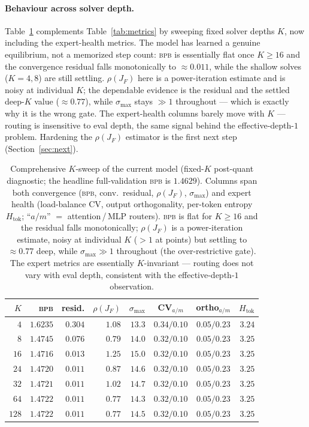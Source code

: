 \documentclass[11pt]{article}
\newcommand{\rhoF}{\rho(J_F)}
\newcommand{\bpb}{\textsc{bpb}}
\begin{document}
\paragraph{Behaviour across solver depth.} Table~\ref{tab:ksweep} complements
Table~\ref{tab:metrics} by sweeping fixed solver depths $K$, now including the
expert-health metrics. The model has learned a
genuine equilibrium, not a memorized step count: \bpb{} is essentially flat once
$K\ge 16$ and the convergence residual falls monotonically to $\approx\!0.011$, while
the shallow solves ($K{=}4,8$) are still settling. $\rhoF$ here is a power-iteration
estimate and is noisy at individual $K$; the dependable evidence is the residual and
the settled deep-$K$ value ($\approx\!0.77$), while $\sigma_{\max}$ stays $\gg 1$
throughout --- which is exactly why it is the wrong gate. The expert-health columns
barely move with $K$ --- routing is insensitive to eval depth, the same signal behind
the effective-depth-$1$ problem. Hardening the $\rhoF$ estimator is the first next
step (Section~\ref{sec:next}).

\begin{table}[H]
\centering
\footnotesize
\setlength{\tabcolsep}{4.5pt}
\renewcommand{\arraystretch}{1.2}
\begin{tabular}{@{}r r r r r c c r@{}}
\toprule
$K$ & \bpb{} & resid. & $\rhoF$ & $\sigma_{\max}$ & CV$_{a/m}$ & ortho$_{a/m}$ & $H_{\text{tok}}$ \\
\midrule
$4$   & $1.6235$ & $0.304$ & $1.08$ & $13.3$ & $0.34/0.10$ & $0.05/0.23$ & $3.24$ \\
$8$   & $1.4745$ & $0.076$ & $0.79$ & $14.0$ & $0.32/0.10$ & $0.05/0.23$ & $3.25$ \\
$16$  & $1.4716$ & $0.013$ & $1.25$ & $15.0$ & $0.32/0.10$ & $0.05/0.23$ & $3.25$ \\
$24$  & $1.4720$ & $0.011$ & $0.87$ & $14.6$ & $0.32/0.10$ & $0.05/0.23$ & $3.25$ \\
$32$  & $1.4721$ & $0.011$ & $1.02$ & $14.7$ & $0.32/0.10$ & $0.05/0.23$ & $3.25$ \\
$64$  & $1.4722$ & $0.011$ & $0.77$ & $14.3$ & $0.32/0.10$ & $0.05/0.23$ & $3.25$ \\
$128$ & $1.4722$ & $0.011$ & $0.77$ & $14.5$ & $0.32/0.10$ & $0.05/0.23$ & $3.25$ \\
\bottomrule
\end{tabular}
\caption{Comprehensive $K$-sweep of the current model (fixed-$K$ post-quant
diagnostic; the headline full-validation \bpb{} is $1.4629$). Columns span both
convergence (\bpb, conv.\ residual, $\rhoF$, $\sigma_{\max}$) and expert health
(load-balance CV, output orthogonality, per-token entropy $H_{\text{tok}}$; ``$a/m$''
$=$ attention\,/\,MLP routers). \bpb{} is flat for $K\ge 16$ and the residual falls
monotonically; $\rhoF$ is a power-iteration estimate, noisy at individual $K$
($>1$ at points) but settling to $\approx 0.77$ deep, while $\sigma_{\max}\!\gg\!1$
throughout (the over-restrictive gate). The expert metrics are essentially
$K$-invariant --- routing does not vary with eval depth, consistent with the
effective-depth-$1$ observation.}
\label{tab:ksweep}
\end{table}
\end{document}
